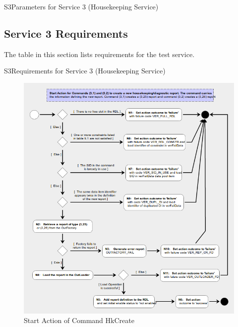 \documentclass[a4paper,10pt]{article}
\newenvironment{cr_req}[2]
{
\begin{longtable}{|l|p{11.8cm}|}
\caption{#2}\label{tab:Req-#1} \\
\hline
\rowcolor{light-gray}
\textbf{Req. ID} & \textbf{Requirement Text}\\
\hline\hline
\endfirsthead
\rowcolor{light-gray}
\textbf{Req. ID} & \textbf{Requirement Text}\\
\hline\hline
\endhead
\DTLforeach*[\DTLiseq{\cat}{#1}]{dbReq}{\cat=Category,\type=Type,\id=Id,\reqText=Text}
{\DTLiffirstrow{}{\\\hline}P-\cat-\id/\type & \textit{\reqText}}\\\hline
}
{\end{longtable}}
\newenvironment{cr_par}[2]
{
\begin{longtable}{|l|p{9.5cm}|}
\caption{#2}\label{tab:Par-#1} \\
\hline
\rowcolor{light-gray}
\textbf{Name} & \textbf{Description}\\
\hline\hline
\endfirsthead
\rowcolor{light-gray}
\textbf{Name} & \textbf{Description}\\
\hline\hline
\endhead
\DTLforeach*[\DTLiseq{\cat}{#1}]{dbPar}{\cat=Category,\name=Name,\desc=Desc}
{\DTLiffirstrow{}{\\\hline}\texttt{\name} & \desc}\\\hline
}
{\end{longtable}}
\begin{document}
\begin{cr_par}{S3}{Parameters for Service 3 (Housekeeping Service)}
\end{cr_par}

\subsection{Service 3 Requirements}
The table in this section lists requirements for the test service.

\begin{cr_req}{S3}{Requirements for Service 3 (Housekeeping Service)}
\end{cr_req}

\begin{figure}[H]
 \centering
 \includegraphics[scale=0.55,keepaspectratio=true]{CrPsCmd3s1Start.png}
 \caption{Start Action of Command HkCreate}
 \label{fig:Cmd3s1Start}
\end{figure}
\end{document}
